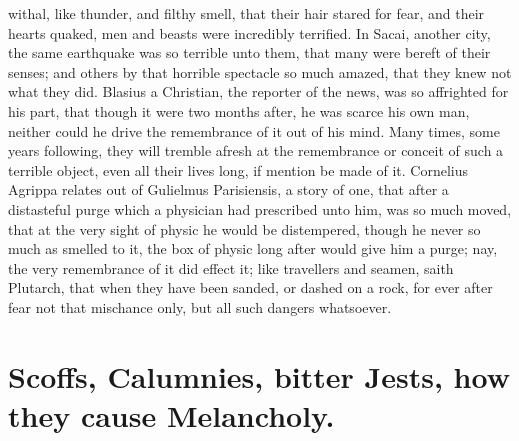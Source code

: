 {withal, like thunder, and filthy smell, that their hair stared for
fear, and their hearts quaked, men and beasts were incredibly
terrified. In Sacai, another city, the same earthquake was so terrible
unto them, that many were bereft of their senses; and others by that
horrible spectacle so much amazed, that they knew not what they did.
Blasius a Christian, the reporter of the news, was so affrighted for
his part, that though it were two months after, he was scarce his own
man, neither could he drive the remembrance of it out of his mind. Many
times, some years following, they will tremble afresh at the
remembrance or conceit of such a terrible object, even all their
lives long, if mention be made of it. Cornelius Agrippa relates out of
Gulielmus Parisiensis, a story of one, that after a distasteful purge
which a physician had prescribed unto him, was so much moved,
that at the very sight of physic he would be distempered, though
he never so much as smelled to it, the box of physic long after would
give him a purge; nay, the very remembrance of it did effect it;
like travellers and seamen, saith Plutarch, that when they have
been sanded, or dashed on a rock, for ever after fear not that
mischance only, but all such dangers whatsoever.

\section[Scoffs, bitter Jests]{Scoffs, Calumnies, bitter Jests, how they cause Melancholy.}\label{sec:scoffs-bitter-jests}

}
